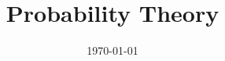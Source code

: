 \documentclass[11pt]{report}
\title{\textbf{Probability Theory}} %
\author{\scribe} %
\date{\today} %
\begin{document}
\maketitle	
\tableofcontents
\chapter{}

\chapter{}

\chapter{}

\chapter{}

\chapter{}

\chapter{}

\end{document}
